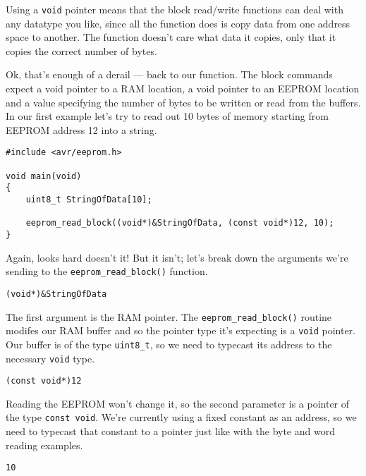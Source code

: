 \documentclass[a4paper,oneside,notitlepage]{book}
\begin{document}
Using a \lstinline{void} pointer means that the block read/write functions can deal with any datatype you like, since all the function does is copy data from one address space to another. The function doesn't care what data it copies, only that it copies the correct number of bytes.

Ok, that's enough of a derail --- back to our function. The block commands expect a void pointer to a RAM location, a void pointer to an EEPROM location and a value specifying the number of bytes to be written or read from the buffers. In our first example let's try to read out 10 bytes of memory starting from EEPROM address 12 into a string.

\begin{center}
\begin{lstlisting}
#include <avr/eeprom.h>

void main(void)
{
    uint8_t StringOfData[10];

    eeprom_read_block((void*)&StringOfData, (const void*)12, 10);
}
\end{lstlisting}
\end{center}

Again, looks hard doesn't it! But it isn't; let's break down the arguments we're sending to the \lstinline{eeprom_read_block()} function.

\begin{center}
\begin{lstlisting}
(void*)&StringOfData
\end{lstlisting}
\end{center}

The first argument is the RAM pointer. The \lstinline{eeprom_read_block()} routine modifes our RAM buffer and so the pointer type it's expecting is a \lstinline{void} pointer. Our buffer is of the type \lstinline{uint8_t}, so we need to typecast its address to the necessary \lstinline{void} type.

\begin{center}
\begin{lstlisting}
(const void*)12
\end{lstlisting}
\end{center}

Reading the EEPROM won't change it, so the second parameter is a pointer of the type \lstinline{const void}. We're currently using a fixed constant as an address, so we need to typecast that constant to a pointer just like with the byte and word reading examples.

\begin{center}
\begin{lstlisting}
10
\end{lstlisting}
\end{center}
\end{document}
